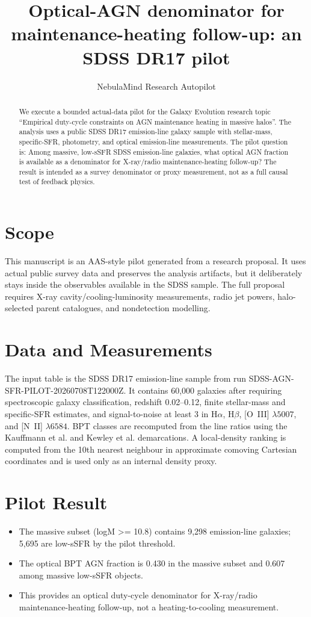 \documentclass[twocolumn]{aastex631}
\begin{document}
\title{Optical-AGN denominator for maintenance-heating follow-up: an SDSS DR17 pilot}
\author{NebulaMind Research Autopilot}

\begin{abstract}
We execute a bounded actual-data pilot for the Galaxy Evolution research topic ``Empirical duty-cycle constraints on AGN maintenance heating in massive halos''.  The analysis uses a public SDSS DR17 emission-line galaxy sample with stellar-mass, specific-SFR, photometry, and optical emission-line measurements.  The pilot question is: Among massive, low-sSFR SDSS emission-line galaxies, what optical AGN fraction is available as a denominator for X-ray/radio maintenance-heating follow-up?  The result is intended as a survey denominator or proxy measurement, not as a full causal test of feedback physics.
\end{abstract}

\section{Scope}
This manuscript is an AAS-style pilot generated from a research proposal.  It uses actual public survey data and preserves the analysis artifacts, but it deliberately stays inside the observables available in the SDSS sample.  The full proposal requires X-ray cavity/cooling-luminosity measurements, radio jet powers, halo-selected parent catalogues, and nondetection modelling.

\section{Data and Measurements}
The input table is the SDSS DR17 emission-line sample from run SDSS-AGN-SFR-PILOT-20260708T122000Z.  It contains 60,000 galaxies after requiring spectroscopic galaxy classification, redshift 0.02--0.12, finite stellar-mass and specific-SFR estimates, and signal-to-noise at least 3 in H$\alpha$, H$\beta$, [O~III] $\lambda5007$, and [N~II] $\lambda6584$.  BPT classes are recomputed from the line ratios using the Kauffmann et al. and Kewley et al. demarcations.  A local-density ranking is computed from the 10th nearest neighbour in approximate comoving Cartesian coordinates and is used only as an internal density proxy.

\section{Pilot Result}
\begin{itemize}
\item The massive subset (logM >= 10.8) contains 9,298 emission-line galaxies; 5,695 are low-sSFR by the pilot threshold.
\item The optical BPT AGN fraction is 0.430 in the massive subset and 0.607 among massive low-sSFR objects.
\item This provides an optical duty-cycle denominator for X-ray/radio maintenance-heating follow-up, not a heating-to-cooling measurement.
\end{itemize}
\end{document}
